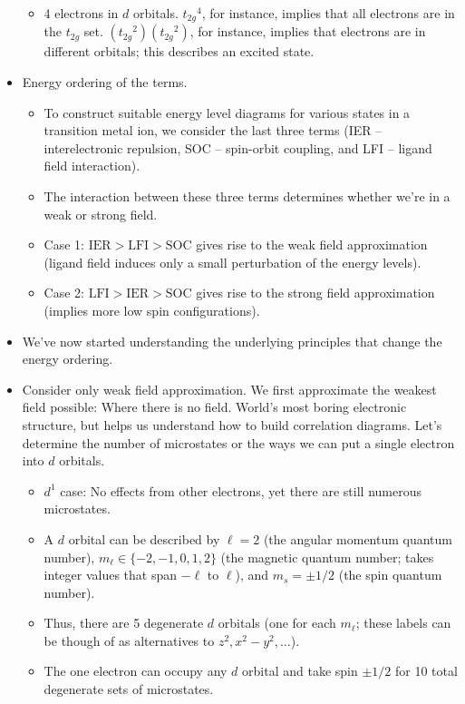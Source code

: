\documentclass[../notes.tex]{subfiles}
\begin{document}
\begin{itemize}
\begin{itemize}
        \item 4 electrons in $d$ orbitals. ${t_{2g}}^4$, for instance, implies that all electrons are in the $t_{2g}$ set. $({t_{2g}}^2)({t_{2g}}^2)$, for instance, implies that electrons are in different orbitals; this describes an excited state.
    \end{itemize}
    \item Energy ordering of the terms.
    \begin{itemize}
        \item To construct suitable energy level diagrams for various states in a transition metal ion, we consider the last three terms (IER -- interelectronic repulsion, SOC -- spin-orbit coupling, and LFI -- ligand field interaction).
        \item The interaction between these three terms determines whether we're in a weak or strong field.
        \item Case 1: $\text{IER}>\text{LFI}>\text{SOC}$ gives rise to the weak field approximation (ligand field induces only a small perturbation of the energy levels).
        \item Case 2: $\text{LFI}>\text{IER}>\text{SOC}$ gives rise to the strong field approximation (implies more low spin configurations).
    \end{itemize}
    \item We've now started understanding the underlying principles that change the energy ordering.
    \item Consider only weak field approximation. We first approximate the weakest field possible: Where there is no field. World's most boring electronic structure, but helps us understand how to build correlation diagrams. Let's determine the number of microstates or the ways we can put a single electron into $d$ orbitals.
    \begin{itemize}
        \item $d^1$ case: No effects from other electrons, yet there are still numerous microstates.
        \item A $d$ orbital can be described by $\ell=2$ (the angular momentum quantum number), $m_\ell\in\{-2,-1,0,1,2\}$ (the magnetic quantum number; takes integer values that span $-\ell$ to $\ell$), and $m_s=\pm 1/2$ (the spin quantum number).
        \item Thus, there are 5 degenerate $d$ orbitals (one for each $m_\ell$; these labels can be though of as alternatives to $z^2,x^2-y^2,\dots$).
        \item The one electron can occupy any $d$ orbital and take spin $\pm 1/2$ for 10 total degenerate sets of microstates.

\end{itemize}
\end{itemize}
\end{document}
